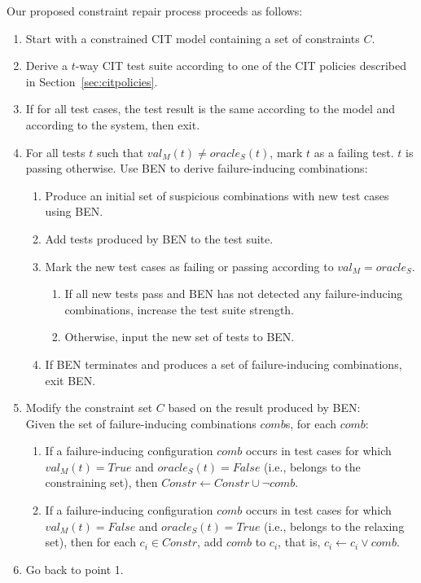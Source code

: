 \begin{tikzborder}{\cite{Gargantini16:validation}}
\begin{tikzborder}{\cite{gargantini_combinatorial_2017}}
Our proposed constraint repair process proceeds as follows:
\begin{enumerate}
	\item Start with a constrained CIT model containing a set of constraints $C$.
	\item Derive a $t$-way CIT test suite according to one of the CIT policies described in Section~\ref{sec:citpolicies}.
	\item If for all test cases, the test result is the same according to the model and according to the system, then exit.
	\item For all tests $t$ such that $val_M(t) \neq \mathit{oracle}_{S}(t)$, mark $t$ as a failing test. $t$ is passing otherwise. Use BEN to derive failure-inducing combinations:
	\begin{enumerate}
		\item Produce an initial set of suspicious combinations with new test cases using BEN.
		\item Add tests produced by BEN to the test suite. 
		\item Mark the new test cases as failing or passing according to $val_{M}=\mathit{oracle}_{S}$.
		\begin{enumerate}
			\item If all new tests pass and BEN has not detected any failure-inducing combinations, increase the test suite strength. %
			\item Otherwise, input the new set of tests to BEN.
		\end{enumerate}
		\item If BEN terminates and produces a set of failure-inducing combinations, exit BEN.
	\end{enumerate}
	\item Modify the constraint set $C$ based on the result produced by BEN: \\
	Given the set of failure-inducing combinations $comb$s, for each $comb$:
	\begin{enumerate} 
		\item If a failure-inducing configuration $comb$ occurs in test cases for which $val_M(t)=\mathit{True}$ and $\mathit{oracle}_{S}(t)=\mathit{False}$ (i.e., belongs to the constraining set), then $\mathit{Constr}\leftarrow \mathit{Constr} \cup \neg comb$.
		\item If a failure-inducing configuration $comb$ occurs in test cases for which $val_M(t)=\mathit{False}$ and $\mathit{oracle}_{S}(t)=\mathit{True}$ (i.e., belongs to the relaxing set), then for each $c_i \in \mathit{Constr}$, add $comb$ to $c_i$, that is, $c_i \leftarrow c_i \vee comb$.
	\end{enumerate}
	\item Go back to point 1. 
\end{enumerate}




\end{tikzborder}
\end{tikzborder}
